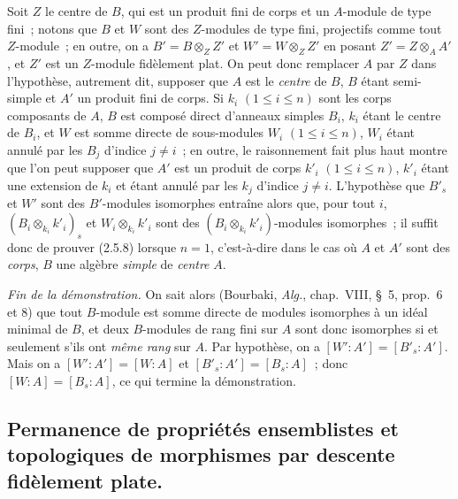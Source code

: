 \begin{env}[2.5.8.8]
Soit $Z$ le centre de $B$, qui est un produit fini de corps et un $A$-module
de type fini~; notons que $B$ et $W$ sont des $Z$-modules de type fini,
projectifs comme tout $Z$-module~; en outre, on a
$B'=B\otimes_Z Z'$ et $W'=W\otimes_Z Z'$ en posant
$Z'=Z\otimes_A A'$, et $Z'$ est un $Z$-module fidèlement plat. On peut donc
remplacer $A$ par $Z$ dans l'hypothèse, autrement dit, supposer que $A$ est
le \emph{centre} de $B$, $B$ étant semi-simple et $A'$ un produit fini de corps. Si
$k_i$ $(1\leq i\leq n)$ sont les corps composants de $A$, $B$ est composé
direct d'anneaux simples $B_i$, $k_i$ étant le centre de $B_i$, et $W$ est
somme directe de sous-modules $W_i$ $(1\leq i\leq n)$, $W_i$ étant annulé
par les $B_j$ d'indice $j\ne i$~; en outre, le raisonnement fait plus haut
montre que l'on peut supposer que $A'$ est un produit de corps $k'_i$
$(1\leq i\leq n)$, $k'_i$ étant une extension de $k_i$ et étant annulé par
les $k_j$ d'indice $j\ne i$. L'hypothèse que $B'_s$ et $W'$ sont des
$B'$-modules isomorphes entraîne alors que, pour
tout $i$,
$(B_i\otimes_{k_i}k'_i)_s$ et $W_i\otimes_{k_i}k'_i$ sont des
$(B_i\otimes_{k_i}k'_i)$-modules isomorphes~; il suffit donc de prouver
(2.5.8) lorsque $n=1$, c'est-à-dire dans le cas où $A$ et $A'$ sont des
\emph{corps}, $B$ une algèbre \emph{simple} de \emph{centre} $A$.
\end{env}

\begin{env}[2.5.8.9]
\label{IV.2.5.8.9-fr}
\emph{Fin de la démonstration.} On sait alors (Bourbaki, \emph{Alg.},
chap.~VIII, \S~5, prop.~6 et 8) que tout $B$-module est somme directe de
modules isomorphes à un idéal minimal de $B$, et deux $B$-modules de rang
fini sur $A$ sont donc isomorphes si et seulement s'ils ont \emph{même rang} sur
$A$. Par hypothèse, on a $[W':A']=[B'_s:A']$. Mais on a
$[W':A']=[W:A]$ et $[B'_s:A']=[B_s:A]$~; donc $[W:A]=[B_s:A]$, ce qui
termine la démonstration.
\end{env}

\subsection{Permanence de propriétés ensemblistes et topologiques de morphismes
par descente fidèlement plate.}
\label{subsection:IV.2.6-fr}

